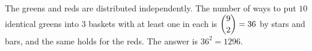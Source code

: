 The greens and reds are distributed independently. The number of ways to put $10$ identical greens into $3$ baskets with at least one in each is $\dbinom{9}{2}=36$ by stars and bars, and the same holds for the reds. The answer is $36^2=\boxed{1296}$.
